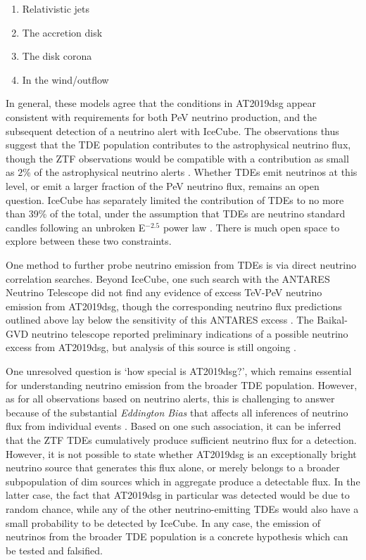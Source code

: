 \documentclass[a4paper,11pt]{article}
\begin{document}
\begin{enumerate}[i]
	\item Relativistic jets \cite{winter_bran_21, winter_icrc_21, liu21_bran}
	\item The accretion disk \cite{hayasaki_19}
	\item The disk corona \cite{murase_tde_20}
	\item In the wind/outflow \cite{murase_tde_20}
\end{enumerate}

In general, these models agree that the conditions in AT2019dsg appear consistent with requirements for both PeV neutrino production, and the subsequent detection of a neutrino alert with IceCube. The observations thus suggest that the TDE population contributes to the astrophysical neutrino flux, though the ZTF observations would be compatible with a contribution as small as $2$\% of the astrophysical neutrino alerts \cite{bran}. Whether TDEs emit neutrinos at this level, or emit a larger fraction of the PeV neutrino flux, remains an open question. IceCube has separately limited the contribution of TDEs to no more than 39\% of the total, under the assumption that TDEs are neutrino standard candles following an unbroken E$^{-2.5}$ power law \cite{stein_19}. There is much open space to explore between these two constraints.

One method to further probe neutrino emission from TDEs is via direct neutrino correlation searches. Beyond IceCube, one such search with the ANTARES Neutrino Telescope did not find any evidence of excess TeV-PeV neutrino emission from AT2019dsg, though the corresponding neutrino flux predictions outlined above lay below the sensitivity of this ANTARES excess \cite{antares_tde_21, illuminati_21}. The Baikal-GVD neutrino telescope reported preliminary indications of a possible neutrino excess from AT2019dsg, but analysis of this source is still ongoing \cite{baikail_tde_21}. 

One unresolved question is `how special is AT2019dsg?', which remains essential for understanding neutrino emission from the broader TDE population. However, as for all observations based on neutrino alerts, this is challenging to answer because of the substantial \emph{Eddington Bias} that affects all inferences of neutrino flux from individual events \cite{nora_eddington_19}. Based on one such association, it can be inferred that the ZTF TDEs cumulatively produce sufficient neutrino flux for a detection. However, it is not possible to state whether AT2019dsg is an exceptionally bright neutrino source that generates this flux alone, or merely belongs to a broader subpopulation of dim sources which in aggregate produce a detectable flux. In the latter case, the fact that AT2019dsg in particular was detected would be due to random chance, while any of the other neutrino-emitting TDEs would also have a small probability to be detected by IceCube. In any case, the emission of neutrinos from the broader TDE population is a concrete hypothesis which can be tested and falsified.
\end{document}
